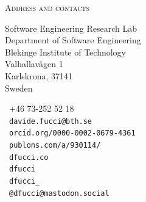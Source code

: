 \documentclass[9pt]{article}
\makeatletter
\def\myemail{davide.fucci@bth.se}
\def\myphone{+46 73-252 52 18}
\def\mymastodon{@dfucci@mastodon.social}
\def\mypublons{publons.com/a/930114/}
\def\myorcid{orcid.org/0000-0002-0679-4361}
\makeatother
\begin{document}
  \textheight=580pt
  \raggedbottom
  \thispagestyle{fancy}


  \reversemarginpar
  \noindent\textsc{Address and contacts}\\
    \begin{minipage}[t]{2in}
{\footnotesize Software Engineering Research Lab\vspace{-0.04in}\\
  \noindent Department of Software Engineering \vspace{-0.04in}\\
    \noindent Blekinge Institute of Technology \vspace{-0.01in}\\
    \noindent Valhallavägen 1 \vspace{-0.04in}\\
    \noindent Karlskrona, 37141 \vspace{-0.04in}\\
    \noindent Sweden
}
\end{minipage}
\begin{minipage}[t]{1.7in}
{\footnotesize \faPhone~\myphone \\
  \noindent \faEnvelope~\texttt{\myemail}\vspace{-0.03in}\\
    \noindent \aiOrcid~\texttt{\myorcid} \vspace{-0.03in}\\
    \noindent \aiPublonsSquare~\texttt{\mypublons} \vspace{-0.03in}\\
    \noindent \faSitemap~\texttt{dfucci.co} \vspace{-0.03in}\\
    \noindent \faGithub~\texttt{dfucci} \vspace{-0.03in}\\
    \noindent  \faTwitter~\texttt{dfucci\_}\vspace{-0.03in}\\
  \noindent  \faMastodon~\texttt{\mymastodon}
}
\end{minipage}
\end{document}
